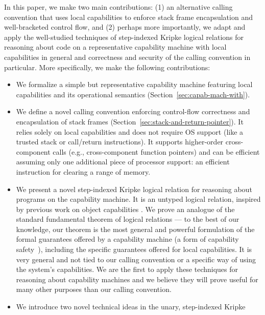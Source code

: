 \documentclass[format=acmsmall, review=false, screen=true]{acmart}
\renewcommand{\sectionname}{Section}
\begin{document}
In this paper, we make two main contributions: (1) an alternative calling
convention that uses local capabilities to enforce stack frame encapsulation and
well-bracketed control flow, and (2) perhaps more importantly, we adapt and
apply the well-studied techniques of step-indexed Kripke logical relations for
reasoning about code on a representative capability machine with local
capabilities in general and correctness and security of the calling convention
in particular. More specifically, we make the following contributions:
\begin{itemize}
\item We formalize a simple but representative capability machine featuring local
  capabilities and its operational semantics
  (\sectionname~\ref{sec:capab-mach-with}).
\item We define a novel calling convention enforcing control-flow correctness and
  encapsulation of stack frames (\sectionname~\ref{sec:stack-and-return-pointer}). It
  relies solely on local capabilities and does not require OS support (like a
  trusted stack or call/return instructions).
  It supports higher-order cross-component calls (e.g., cross-component function
  pointers) and can be efficient assuming only one additional piece of processor
  support: an efficient instruction for clearing a range of memory.
\item We present a novel step-indexed Kripke logical relation for reasoning
  about programs on the capability machine. It is an untyped logical relation,
  inspired by previous work on object capabilities \citep{Devriese:2016ObjCap}.
  We prove an analogue of the standard fundamental theorem of logical relations
  --- to the best of our knowledge, our theorem is %
  the most general and powerful formulation of the formal guarantees offered by
  a capability machine (a form of capability
  safety~\citep{Devriese:2016ObjCap,Maffeis2010OC}), including the specific
  guarantees offered for local capabilities. It is very general and not tied to
  our calling convention or a specific way of using the system's capabilities.
  We are the first to apply these techniques for reasoning about capability
  machines and we believe they will prove useful for many other purposes than
  our calling convention.
\item We introduce two novel technical ideas in the unary, step-indexed Kripke

\end{itemize}
\end{document}
